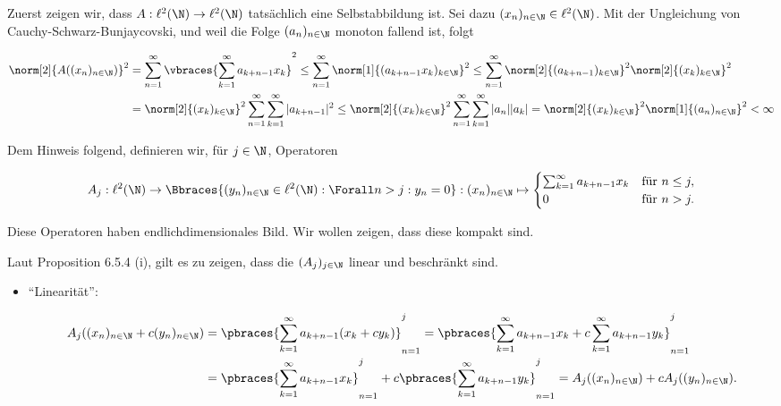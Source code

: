\begin{solution}

Zuerst zeigen wir, dass $A: \ell^2(\N) \to \ell^2(\N)$ tatsächlich eine Selbstabbildung ist.
Sei dazu $(x_n)_{n \in \N} \in \ell^2(\N)$.
Mit der Ungleichung von Cauchy-Schwarz-Bunjaycovski, und weil die Folge $(a_n)_{n \in \N}$ monoton fallend ist, folgt

\begin{align*}
  \norm[2]{A((x_n)_{n \in \N})}^2
  & =
  \sum_{n=1}^\infty
  \vbraces
  {
    \sum_{k=1}^\infty
    a_{k+n-1} x_k
  }^2
  \leq
  \sum_{n=1}^\infty
  \norm[1]{(a_{k+n-1} x_k)_{k \in \N}}^2
  \leq
  \sum_{n=1}^\infty
  \norm[2]{(a_{k+n-1})_{k \in \N}}^2
  \norm[2]{(x_k)_{k \in \N}}^2 \\
  & =
  \norm[2]{(x_k)_{k \in \N}}^2
  \sum_{n=1}^\infty
  \sum_{k=1}^\infty
  |a_{k+n-1}|^2
  \leq
  \norm[2]{(x_k)_{k \in \N}}^2
  \sum_{n=1}^\infty
  \sum_{k=1}^\infty
  |a_n| |a_k|
  =
  \norm[2]{(x_k)_{k \in \N}}^2
  \norm[1]{(a_n)_{n \in \N}}^2 < \infty
\end{align*}

Dem Hinweis folgend, definieren wir, für $j \in \N$, Operatoren

\begin{align*}
  A_j:
  \ell^2(\N)
  \to
  \Bbraces
  {
    (y_n)_{n \in \N} \in \ell^2(\N):
    \Forall n > j:
    y_n = 0
  }:
  (x_n)_{n \in \N}
  \mapsto
  \begin{cases}
    \sum_{k=1}^\infty
    a_{k+n-1} x_k
    &
    \text{für } n \leq j, \\
    0
    &
    \text{für } n > j.
  \end{cases}
\end{align*}

Diese Operatoren haben endlichdimensionales Bild.
Wir wollen zeigen, dass diese kompakt sind.


Laut Proposition 6.5.4 (i), gilt es zu zeigen, dass die $(A_j)_{j \in \N}$ linear und beschränkt sind.

\begin{itemize}

  \item
  \enquote{Linearität}:

  \begin{align*}
    A_j((x_n)_{n \in \N} + c (y_n)_{n \in \N})
    & =
    \pbraces
    {
      \sum_{k=1}^\infty
      a_{k+n-1}
      (x_k + c y_k)
    }_{n=1}^j
    =
    \pbraces
    {
      \sum_{k=1}^\infty
      a_{k+n-1} x_k +
      c
      \sum_{k=1}^\infty
      a_{k+n-1} y_k
    }_{n=1}^j \\
    & =
    \pbraces
    {
      \sum_{k=1}^\infty
      a_{k+n-1} x_k
    }_{n=1}^j +
    c \pbraces
    {
      \sum_{k=1}^\infty
      a_{k+n-1} y_k
    }_{n=1}^j
    =
    A_j((x_n)_{n \in \N}) +
    c
    A_j((y_n)_{n \in \N}).
  \end{align*}


\end{itemize}
\end{solution}
